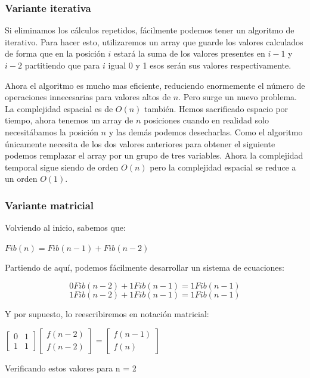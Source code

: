 \subsubsection*{Variante iterativa}

Si eliminamos los cálculos repetidos, fácilmente podemos tener un algoritmo de iterativo. Para hacer esto, utilizaremos un array que guarde los valores calculados de forma que en la posición $i$  estará la suma de los valores presentes en $i-1$ y $i-2$ partitiendo que para $i$ igual 0 y 1 esos serán sus valores respectivamente. 

Ahora el algoritmo es mucho mas eficiente, reduciendo enormemente el número de operaciones innecesarias para valores altos de $n$. Pero surge un nuevo problema. La complejidad espacial es de $O(n)$ también. Hemos sacrificado espacio por tiempo, ahora tenemos un array de $n$ posiciones cuando en realidad solo necesitábamos la posición $n$ y las demás podemos desecharlas. Como el algoritmo únicamente necesita de los dos valores anteriores para obtener el siguiente podemos remplazar el array por un grupo de tres variables. Ahora la complejidad temporal sigue siendo de orden $O(n)$ pero la complejidad espacial se reduce a un orden $O(1)$.

\subsubsection*{Variante matricial}

Volviendo al inicio, sabemos que:

$Fib(n)=Fib(n-1)+Fib(n-2)$

Partiendo de aquí, podemos fácilmente desarrollar un sistema de ecuaciones:

\[ 0Fib(n-2)+1Fib(n-1)=1Fib(n-1) \]
\[ 1Fib(n-2)+1Fib(n-1)=1Fib(n-1) \]

Y por supuesto, lo reescribiremos en notación matricial:


$
\begin{bmatrix}
	0 & 1 \\ 
	1 & 1
\end{bmatrix}
\begin{bmatrix}
	f(n-2)  \\ 
	f(n-2)
\end{bmatrix}
=
\begin{bmatrix}
	f(n-1)  \\ 
	f(n)
\end{bmatrix} 
$


Verificando estos valores para n = 2


